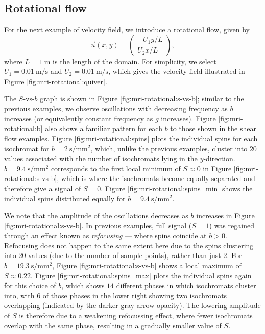         \subsection{Rotational flow} \label{sec:numerical-mri:manufactured:rotational}
            For the next example of velocity field, we introduce a rotational flow, given by
            \begin{equation}
                \vec{u}(x, y) = \begin{pmatrix}-U_1 y / L \\ U_2 x / L\end{pmatrix},
            \end{equation}
            where $L = \qty{1}{\metre}$ is the length of the domain.
            For simplicity, we select $U_1 = \qty{0.01}{\metre\per\second}$ and $U_2 = \qty{0.01}{\metre\per\second}$, which gives the velocity field illustrated in Figure \ref{fig:mri-rotational:quiver}.
            
            The $S$-vs-$b$ graph is shown in Figure \ref{fig:mri-rotational:s-vs-b}; similar to the previous examples, we observe oscillations with decreasing frequency as $b$ increases (or equivalently constant frequency as $g$ increases). Figure \ref{fig:mri-rotational:b} also shows a familiar pattern for each $b$ to those shown in the shear flow examples. Figure \ref{fig:mri-rotational:spins} plots the individual spins for each isochromat for $b=\qty{2}{\second\per\milli\metre^2}$, which, unlike the previous examples, cluster into $20$ values associated with the number of isochromats lying in the $y$-direction. $b=\qty{9.4}{\second\per\milli\metre^2}$ corresponds to the first local minimum of $\bar{S} \approx 0$ in Figure \ref{fig:mri-rotational:s-vs-b}, which is where the isochromats become equally-separated and therefore give a signal of $\bar{S}=0$. Figure \ref{fig:mri-rotational:spins_min} shows the individual spins distributed equally for $b=\qty{9.4}{\second\per\milli\metre^2}$.
            
            We note that the amplitude of the oscillations decreases as $b$ increases in Figure \ref{fig:mri-rotational:s-vs-b}. In previous examples, full signal ($\bar{S}=1$) was regained through an effect known as \textit{refocusing} --- where spins coincide at $b>0$. Refocusing does not happen to the same extent here due to the spins clustering into $20$ values (due to the number of sample points), rather than just $2$. For $b = \qty{19.3}{\second\per\milli\metre^2}$, Figure \ref{fig:mri-rotational:s-vs-b} shows a local maximum of $\bar{S} \approx 0.22$. Figure \ref{fig:mri-rotational:spins_max} plots the individual spins again for this choice of $b$, which shows $14$ different phases in which isochromats cluster into, with $6$ of those phases in the lower right showing two isochromats overlapping (indicated by the darker gray arrow opacity). The lowering amplitude of $\bar{S}$ is therefore due to a weakening refocussing effect, where fewer isochromats overlap with the same phase, resulting in a gradually smaller value of $\bar{S}$.


